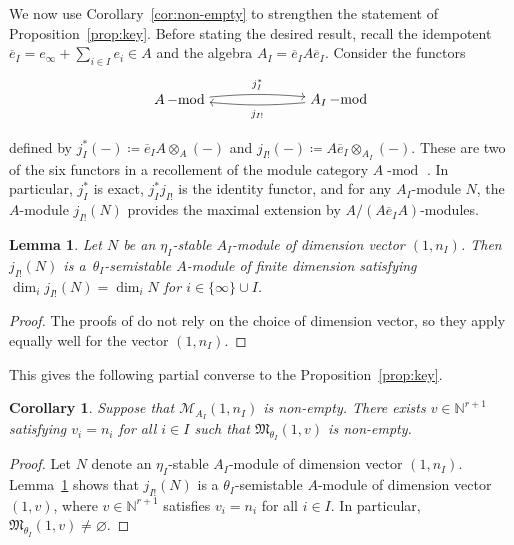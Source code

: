 \documentclass[11pt]{article}
\numberwithin{equation}{section}
\newtheorem{Corollary}[Theorem]{Corollary}
\newtheorem{Lemma}[Theorem]{Lemma}
\newcommand{\PiQ}{A}
\DeclareMathOperator{\module}{\mathrm{-mod}}
\numberwithin{equation}{section}
\begin{document}
We now use Corollary~\ref{cor:non-empty} to strengthen the statement of Proposition~\ref{prop:key}. Before stating the desired result, recall the idempotent $\overline{e}_I=e_\infty+\sum_{i\in I} e_i\in A$ and the algebra $A_I=\overline{e}_I A\overline{e}_I$. Consider the functors
 \[
\begin{tikzpicture}
\node (v1) at (0,0) {\scriptsize ${{\PiQ}\module}$};
\node (v2) at (4,0) {\scriptsize ${{\PiQ_I}\module}$};

\draw [->,bend right=-5] (v1) to node[above] {$\scriptstyle{j_I^*}$} (v2);
\draw [->,bend left=5] (v2) to node[below] {$\scriptstyle{j_{I!}}$} (v1);
\end{tikzpicture}
\]
 defined by $j_I^*(-)\coloneqq \overline{e}_I \PiQ \otimes_{\PiQ} (-)$ and $j_{I!}(-)\coloneqq \PiQ \overline{e}_I\otimes_{\PiQ_I}(-)$. These are two of the six functors in a recollement of the module category ${\PiQ}\module$ \cite[Section 3]{craw2018multigraded}. In particular, $j_I^*$ is exact, $j_I^*j_{I!}$ is the identity functor, and for any $\PiQ_I$-module $N$, the $\PiQ$-module $j_{I!}(N)$ provides the maximal extension by $\PiQ/(\PiQ \overline{e}_I\PiQ)$-modules.

\begin{Lemma}\label{lem:j!semistable}
Let $N$ be an $\eta_I$-stable $\PiQ_I$-module of dimension vector $(1,n_I)$. Then $j_{I!}(N)$ is a~$\theta_I$-semistable $\PiQ$-module of finite dimension satisfying $\dim_i j_{I!}(N)=\dim_i N$ for $i \in \{\infty\} \cup I$.
\end{Lemma}
\begin{proof}The proofs of \cite[Lemma~4.4 and Lemma~4.5]{craw2019punctual} do not rely on the choice of dimension vector, so they apply equally well for the vector $(1,n_I)$.
\end{proof}

This gives the following partial converse to the Proposition~\ref{prop:key}.

 \begin{Corollary} Suppose that $\mathcal{M}_{A_I}(1,n_I)$ is non-empty. There exists $v\in \mathbb{N}^{r+1}$ satisfying $v_i=n_i$ for all $i \in I$ such that $\mathfrak{M}_{\theta_I}(1,v)$ is non-empty.
 \end{Corollary}
 \begin{proof}
 Let $N$ denote an $\eta_I$-stable $A_I$-module of dimension vector $(1,n_I)$. Lemma~\ref{lem:j!semistable} shows that $j_{I!}(N)$ is a $\theta_I$-semistable $A$-module of dimension vector $(1,v)$, where $v\in \mathbb{N}^{r+1}$ satisfies $v_i=n_i$ for all $i\in I$. In particular, $\mathfrak{M}_{\theta_I}(1,v)\neq \varnothing$.
 \end{proof}
\end{document}
